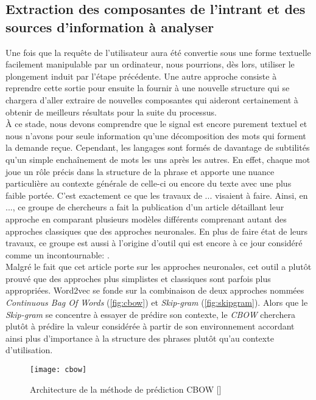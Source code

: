 \subsection{Extraction des composantes de l'intrant et des sources d'information à analyser}
Une fois que la requête de l'utilisateur aura été convertie sous une forme textuelle facilement manipulable par un ordinateur, nous pourrions, dès lors, utiliser le plongement induit par l'étape précédente. Une autre approche consiste à reprendre cette sortie pour ensuite la fournir à une nouvelle structure qui se chargera d'aller extraire de nouvelles composantes qui aideront certainement à obtenir de meilleurs résultats pour la suite du processus. \\

À ce stade, nous devons comprendre que le signal est encore purement textuel et nous n'avons pour seule information qu'une décomposition des mots qui forment la demande reçue. Cependant, les langages sont formés de davantage de subtilités qu'un simple enchaînement de mots les uns après les autres. En effet, chaque mot joue un rôle précis dans la structure de la phrase et apporte une nuance particulière au contexte générale de celle-ci ou encore du texte avec une plus faible portée. C'est exactement ce que les travaux de ... visaient à faire. Ainsi, en ..., ce groupe de chercheurs a fait la publication d'un article détaillant leur approche en comparant plusieurs modèles différents comprenant autant des approches classiques que des approches neuronales. En plus de faire état de leurs travaux, ce groupe est aussi à l'origine d'outil qui est encore à ce jour considéré comme un incontournable: \cite{word2vec}. \\

Malgré le fait que cet article porte sur les approches neuronales, cet outil a plutôt prouvé que des approches plus simplistes et classiques sont parfois plus appropriées. Word2vec se fonde sur la combinaison de deux approches nommées \textit{Continuous Bag Of Words} (\autoref{fig:cbow}) et \textit{Skip-gram} (\autoref{fig:skipgram}). Alors que le \textit{Skip-gram} se concentre à essayer de prédire son contexte, le \textit{CBOW} cherchera plutôt à prédire la valeur considérée à partir de son environnement accordant ainsi plus d’importance à la structure des phrases plutôt qu’au contexte d’utilisation.\\

\begin{figure}[ht]
  \centering
  \texttt{[image: cbow]}
  \caption{Architecture de la méthode de prédiction CBOW []}
  \label{fig:cbow}
\end{figure}

